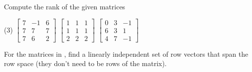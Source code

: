 \begin{exercise} \label{exercise:rankmatrixans}
Compute the rank of the given matrices
\begin{tasks}(3)
\task
$\begin{bmatrix}
7 & -1 & 6 \\
7 & 7 & 7 \\
7 & 6 & 2
\end{bmatrix}$
\task
$\begin{bmatrix}
1 & 1 & 1 \\
1 & 1 & 1 \\
2 & 2 & 2
\end{bmatrix}$
\task
$\begin{bmatrix}
0 & 3 & -1 \\
6 & 3 & 1 \\
4 & 7 & -1
\end{bmatrix}$
\end{tasks}
\end{exercise}

\begin{exercise}
For the matrices in , find
a linearly independent set of row vectors that span the row space
(they don't need to be rows of the matrix).
\end{exercise}

